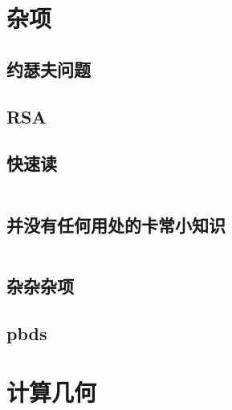 \documentclass[a4paper,11pt]{article}
\begin{document}
\newpage
\section{杂项}

\subsection{约瑟夫问题}


\subsection{RSA}


\subsection{快速读}
\inputminted[breaklines]{c++}{Others/quick_IO.cpp}

\subsection{并没有任何用处的卡常小知识}
\inputminted[breaklines]{c++}{Others/并没有任何用处的卡常小知识.cpp}

\subsection{杂杂杂项}


\subsection{pbds}






\newpage
\section{计算几何}







\end{document}
